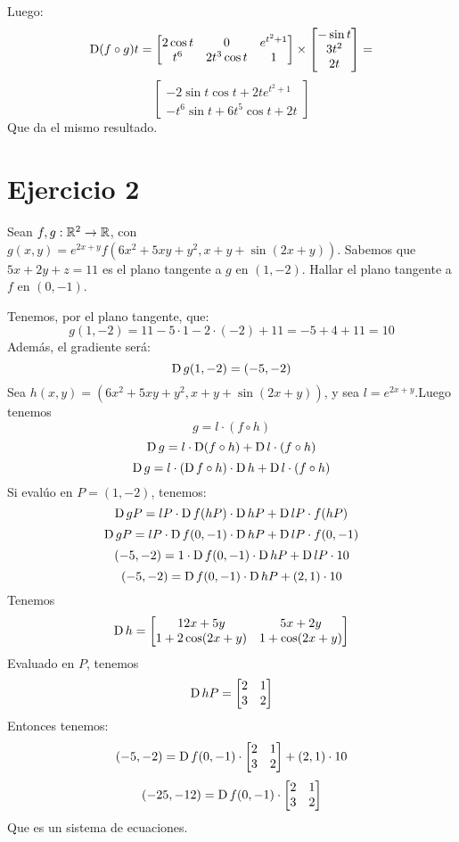 \documentclass{article}
\begin{document}
Luego:
\[
	\operatorname{D} (f\circ g) t = 
	\begin{bmatrix}
		2\cos t & 0 & e^{t^2+1} \\
		t^6 & 2t^3 \cos t & 1
	\end{bmatrix} \times
\begin{bmatrix}
	-\sin t \\
	3t^2 \\
	2t
\end{bmatrix} =
\]
\[
	\begin{bmatrix}
		-2 \sin t \cos t + 2te^{t^2+1} \\
		-t^6\sin t+ 6t^5 \cos t + 2t
		
	\end{bmatrix}
\]
Que da el mismo resultado.

\section*{Ejercicio 2}
Sean $f, g : \mathbb{R}^2 \to \mathbb{R}$, con $g(x,y) = e^{2x+y}f(6x^2+5xy+y^2, x+y+\sin(2x+y))$. Sabemos que $5x + 2y + z = 11$ es el plano tangente a $g$ en $(1, -2)$. Hallar el plano tangente a $f$ en $(0, -1)$.

Tenemos, por el plano tangente, que:
\[
	g(1, -2) = 11 - 5 \cdot 1 - 2 \cdot (-2) + 11 = -5 + 4 + 11 = 10
\]
Además, el gradiente será:
\[\operatorname{D} g(1, -2) = (-5, -2)\]
Sea $h (x,y) = (6x^2+5xy+y^2, x+y+\sin(2x+y))$, y sea $l = e^{2x+y}$.Luego tenemos
\[g = l \cdot (f \circ h)\]
\[\operatorname{D} g = l \cdot \operatorname{D} (f \circ h) + \operatorname{D} l \cdot (f \circ h)\]
\[\operatorname{D} g = l \cdot (\operatorname{D} f \circ h) \cdot \operatorname{D} h + \operatorname{D} l \cdot (f \circ h)\]
Si evalúo en $P = (1, -2)$, tenemos:
\[\operatorname{D} g P = lP \cdot \operatorname{D} f (hP) \cdot \operatorname{D} h P + \operatorname{D} l P \cdot f (h P)\]
\[\operatorname{D} g P = lP \cdot \operatorname{D} f (0, -1) \cdot \operatorname{D} h P + \operatorname{D} l P \cdot f (0, -1)\]
\[(-5, -2) = 1 \cdot \operatorname{D} f (0, -1) \cdot \operatorname{D} h P + \operatorname{D} l P \cdot 10\]
\[(-5, -2) = \operatorname{D} f (0, -1) \cdot \operatorname{D} h P + (2, 1) \cdot 10\]
Tenemos \[\operatorname{D} h =
	\begin{bmatrix}
		12x + 5y & 5x + 2y \\
		1 + 2\cos(2x+y) & 1 + \cos(2x+y)
	\end{bmatrix}
\]
Evaluado en $P$, tenemos
\[\operatorname{D} h P =
	\begin{bmatrix}
		2 & 1 \\
		3 & 2
	\end{bmatrix}
\]
Entonces tenemos:
\[(-5, -2) = \operatorname{D} f (0, -1) \cdot 
	\begin{bmatrix}
		2 & 1 \\
		3 & 2
	\end{bmatrix}
+ (2, 1) \cdot 10\]
\[(-25, -12) = \operatorname{D} f (0, -1) \cdot 
	\begin{bmatrix}
		2 & 1 \\
		3 & 2
	\end{bmatrix}
\]
Que es un sistema de ecuaciones.
\end{document}
